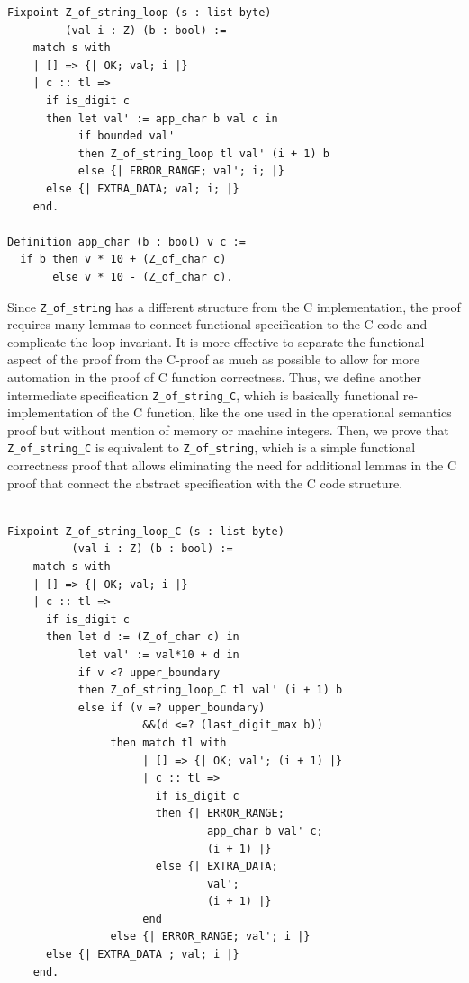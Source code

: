 \documentclass[10p,conference]{IEEEtran}
\begin{document}
 \begin{lstlisting}[language=Coq]
Fixpoint Z_of_string_loop (s : list byte) 
         (val i : Z) (b : bool) := 
    match s with 
    | [] => {| OK; val; i |}
    | c :: tl => 
      if is_digit c
      then let val' := app_char b val c in 
           if bounded val'
           then Z_of_string_loop tl val' (i + 1) b
           else {| ERROR_RANGE; val'; i; |}      
      else {| EXTRA_DATA; val; i; |}              
    end.

Definition app_char (b : bool) v c := 
  if b then v * 10 + (Z_of_char c) 
       else v * 10 - (Z_of_char c).
 \end{lstlisting}

 Since \texttt{Z\_of\_string} has a different structure from the C implementation, the proof requires many lemmas to
 connect functional specification to the C code and complicate the loop
 invariant. It is more effective to separate the
 functional aspect of the proof from the C-proof as much as possible to
 allow for more automation in the proof of C function
 correctness. Thus, we define another intermediate specification
 \texttt{Z\_of\_string\_C}, which is basically functional
 re-implementation of the C function, like the one used in the
 operational semantics proof but without mention of memory or machine integers. Then,
 we prove that \texttt{Z\_of\_string\_C} is equivalent to
 \texttt{Z\_of\_string}, which is a simple functional correctness
 proof that allows eliminating the need for additional lemmas in the
 C proof that connect the abstract specification with the C code structure.

 \begin{lstlisting}[language=Coq]
 
Fixpoint Z_of_string_loop_C (s : list byte)
          (val i : Z) (b : bool) := 
    match s with 
    | [] => {| OK; val; i |}
    | c :: tl => 
      if is_digit c
      then let d := (Z_of_char c) in 
           let val' := val*10 + d in
           if v <? upper_boundary 
           then Z_of_string_loop_C tl val' (i + 1) b
           else if (v =? upper_boundary)
                     &&(d <=? (last_digit_max b))
                then match tl with
                     | [] => {| OK; val'; (i + 1) |}
                     | c :: tl => 
                       if is_digit c
                       then {| ERROR_RANGE; 
                               app_char b val' c; 
                               (i + 1) |}
                       else {| EXTRA_DATA; 
                               val'; 
                               (i + 1) |}
                     end
                else {| ERROR_RANGE; val'; i |}      
      else {| EXTRA_DATA ; val; i |}              
    end.
    
 \end{lstlisting}
\end{document}
